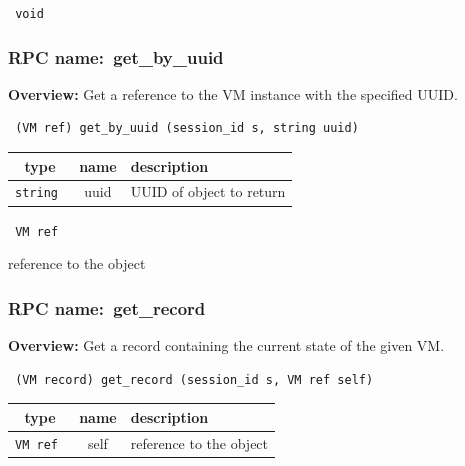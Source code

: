 \vspace{0.3cm}

{\tt 
void
}



\vspace{0.3cm}
\vspace{0.3cm}
\vspace{0.3cm}
\subsubsection{RPC name:~get\_by\_uuid}

{\bf Overview:} 
Get a reference to the VM instance with the specified UUID.

\begin{verbatim} (VM ref) get_by_uuid (session_id s, string uuid)\end{verbatim}



 
\vspace{0.3cm}
\begin{tabular}{|c|c|p{7cm}|}
 \hline
{\bf type} & {\bf name} & {\bf description} \\ \hline
{\tt string } & uuid & UUID of object to return \\ \hline 

\end{tabular}

\vspace{0.3cm}

{\tt 
VM ref
}


reference to the object
\vspace{0.3cm}
\vspace{0.3cm}
\vspace{0.3cm}
\subsubsection{RPC name:~get\_record}

{\bf Overview:} 
Get a record containing the current state of the given VM.

\begin{verbatim} (VM record) get_record (session_id s, VM ref self)\end{verbatim}



 
\vspace{0.3cm}
\begin{tabular}{|c|c|p{7cm}|}
 \hline
{\bf type} & {\bf name} & {\bf description} \\ \hline
{\tt VM ref } & self & reference to the object \\ \hline 

\end{tabular}

